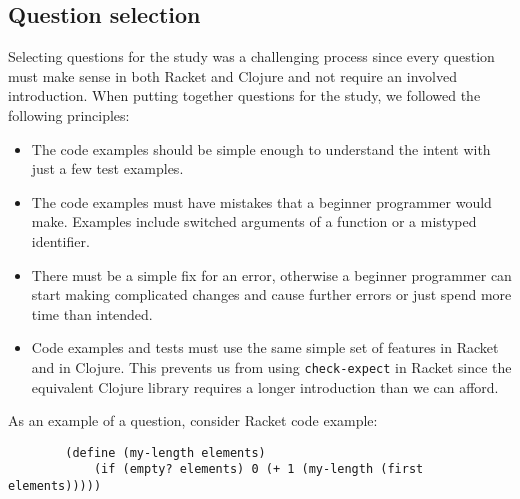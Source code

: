 \documentclass[submission,copyright,creativecommons]{eptcs}
\begin{document}
\subsection{Question selection}\label{sec:select}
	Selecting questions for the study was a challenging process since every question must make sense in both Racket and Clojure and not require an involved introduction. %
	When putting together questions for the study, we followed the following principles:
	\begin{itemize}
	\item The code examples should be simple enough to understand the  intent with just a few test examples. 
	\item The code examples must have mistakes that a beginner programmer would make. Examples include switched arguments of a function or a mistyped identifier. 
	\item There must be a simple fix for an error, otherwise  a beginner
	programmer can start making complicated changes and cause further errors or just spend more time than intended.  %
	\item Code examples and tests must use the same simple set of features in Racket and in Clojure. This prevents us from using \texttt{check-expect} in Racket since the equivalent Clojure library requires a longer introduction than we can afford. 
	\end{itemize}
As an example of a question, consider Racket code example: 
\begin{verbatim}
		(define (my-length elements)
  			(if (empty? elements) 0 (+ 1 (my-length (first elements)))))
\end{verbatim}
\end{document}
